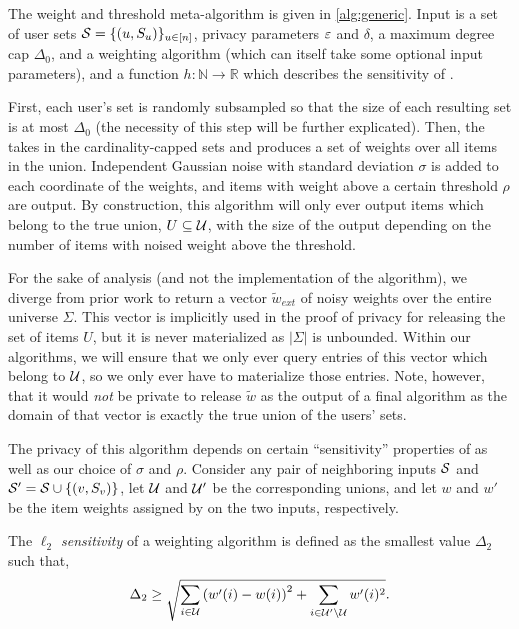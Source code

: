The weight and threshold meta-algorithm is given in \cref{alg:generic}. Input is a set of user sets $\mathcal{S}=\{(u, S_u)\}_{u \in [n]}$, privacy parameters $\varepsilon$ and $\delta$, a maximum degree cap $\Delta_0$, and a weighting algorithm \weightalgo{} (which can itself take some optional input parameters), and a function $h: \mathbb{N} \rightarrow \mathbb{R}$ which describes the sensitivity of \weightalgo{}.

First, each user's set is randomly subsampled so that the size of each resulting set is at most $\Delta_0$ (the necessity of this step will be further explicated).
Then, the \weightalgo{} takes in the cardinality-capped sets and produces a set of weights over all items in the union.
Independent Gaussian noise with standard deviation $\sigma$ is added to each coordinate of the weights, and items with weight above a certain threshold $\rho$ are output.
By construction, this algorithm will only ever output items which belong to the true union,  $U \subseteq \mathcal{U}$, with the size of the output depending on the number of items with noised weight above the threshold.

For the sake of analysis (and not the implementation of the algorithm), we diverge from prior work to return a vector $\tilde{w}_{ext}$ of noisy weights over the entire universe $\Sigma$.
This vector is implicitly used in the proof of privacy for releasing the set of items $U$, but it is never materialized as $|\Sigma|$ is unbounded. 
Within our algorithms, we will ensure that we only ever query entries of this vector which belong to $\mathcal{U}$, so we only ever have to materialize those entries.
Note, however, that it would \emph{not} be private to release $\tilde{w}$ as the output of a final algorithm as the domain of that vector is exactly the true union of the users' sets.

The privacy of this algorithm depends on certain ``sensitivity'' properties of \weightalgo{} as well as our choice of $\sigma$ and $\rho$. Consider any pair of neighboring inputs $\mathcal{S}$ and $\mathcal{S}' = \mathcal{S} \cup \{(v, S_v)\}$, let $\mathcal{U}$ and $\mathcal{U}'$ be the corresponding unions, and let $w$ and $w'$ be the item weights assigned by \weightalgo{} on the two inputs, respectively.

\begin{definition}\label{def:l2-sensitivity}
The \emph{$\ell_2$ sensitivity} of a weighting algorithm is defined as the smallest value $\Delta_2$ such that,
\begin{equation*}
    \Delta_2 \geq \sqrt{\sum_{i \in \mathcal{U}} \left(w'(i) - w(i)\right)^2 + \sum_{i \in \mathcal{U}' \setminus \mathcal{U}} w'(i)^2}.
\end{equation*}
\end{definition}

